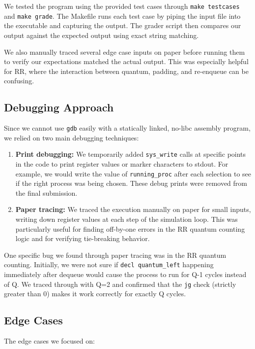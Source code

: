 \documentclass[a4paper,12pt]{article}
\begin{document}
We tested the program using the provided test cases through \texttt{make testcases} and \texttt{make grade}. The Makefile runs each test case by piping the input file into the executable and capturing the output. The grader script then compares our output against the expected output using exact string matching.

We also manually traced several edge case inputs on paper before running them to verify our expectations matched the actual output. This was especially helpful for RR, where the interaction between quantum, padding, and re-enqueue can be confusing.

\subsection{Debugging Approach}

Since we cannot use \texttt{gdb} easily with a statically linked, no-libc assembly program, we relied on two main debugging techniques:

\begin{enumerate}
    \item \textbf{Print debugging:} We temporarily added \texttt{sys\_write} calls at specific points in the code to print register values or marker characters to stdout. For example, we would write the value of \texttt{running\_proc} after each selection to see if the right process was being chosen. These debug prints were removed from the final submission.
    \item \textbf{Paper tracing:} We traced the execution manually on paper for small inputs, writing down register values at each step of the simulation loop. This was particularly useful for finding off-by-one errors in the RR quantum counting logic and for verifying tie-breaking behavior.
\end{enumerate}

One specific bug we found through paper tracing was in the RR quantum counting. Initially, we were not sure if \texttt{decl quantum\_left} happening immediately after dequeue would cause the process to run for Q-1 cycles instead of Q. We traced through with Q=2 and confirmed that the \texttt{jg} check (strictly greater than 0) makes it work correctly for exactly Q cycles.

\subsection{Edge Cases}

The edge cases we focused on:
\end{document}
